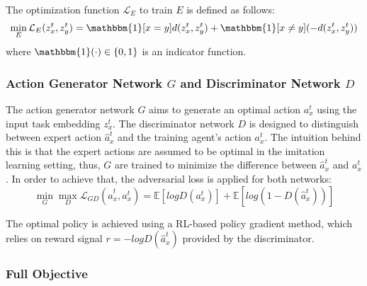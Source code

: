 The optimization function $\mathcal{L}_E$ to train $E$ is defined as follows:
\begin{equation}
  \min_{E}{\mathcal{L}_{E}(z^t_x, z^t_y) =
  \mathbbm{1}[x = y]d(z^t_x, z^t_y)
  + \mathbbm{1}[x \neq y](-d(z^t_x, z^t_y))
  }
\end{equation}
where $\mathbbm{1}(\cdot) \in \{0, 1\}$ is an indicator function.


\subsubsection{Action Generator Network $G$ and Discriminator Network $D$}

The action generator network $G$ aims to generate an optimal action $a^t_x$ using the input task embedding $z^t_x$.
The discriminator network $D$ is designed to distinguish between expert action $\hat{a}^t_x$ and the training agent's action $a^t_x$.
The intuition behind this is that the expert actions are assumed to be optimal in the imitation learning setting,
thus,
$G$ are trained to minimize the difference between $\hat{a}^t_x$ and $a^t_x$.
In order to achieve that,
the adversarial loss \cite{IL_Model_GAIL} is applied for both networks:
\begin{equation}
  \min_{G} \max_{D} \mathcal{L}_{GD}(\hat{a}^t_x, a^t_x) = \mathbb{E}[log D(a^t_x)] + \mathbb{E}[log (1 - D(\hat{a}^t_x))]
\end{equation}

The optimal policy is achieved using a RL-based policy gradient method,
which relies on reward signal $r=-log D(\hat{a}^t_x)$ provided by the discriminator.


\subsubsection{Full Objective}


